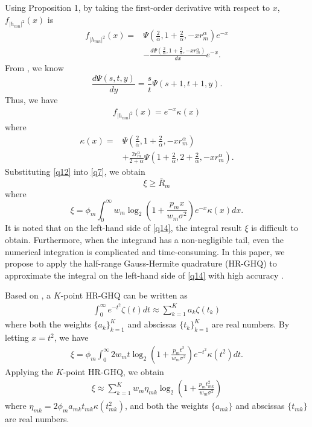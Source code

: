 \documentclass[journal]{IEEEtran}
\begin{document}
Using Proposition 1, by taking the first-order derivative with respect to $x$, $f_{\left|h_{mn} \right|^2} \left(x\right)$ is
\begin{align}
f_{\left|h_{mn} \right|^2} \left(x\right)=&\Psi\left(\frac{2}{\alpha}, 1 + \frac{2}{\alpha}, -xr_m^{\alpha}\right)e^{-x} \nonumber \\&-\frac{d \Psi\left(\frac{2}{\alpha}, 1 + \frac{2}{\alpha}, -x r_m^{\alpha}\right)}{d x} e^{-x}.
\end{align}
From \cite[13.4.8]{MAbramowitz}, we know
\begin{equation}
\frac{d \Psi\left(s, t, y\right)}{dy} = \frac{s}{t}\Psi\left(s+1, t+1, y\right).
\end{equation}
Thus, we have
\begin{align}\label{q12}
f_{\left|h_{mn} \right|^2} \left(x\right)=e^{-x}\kappa\left(x\right)
\end{align}
where
\begin{align}
\kappa\left(x\right) =& \Psi\left(\frac{2}{\alpha}, 1 + \frac{2}{\alpha}, -xr_m^{\alpha}\right)\nonumber \\ & +\frac{2r_m^{\alpha}}{2+\alpha} \Psi\left(1 + \frac{2}{\alpha}, 2+ \frac{2}{\alpha}, -xr_m^{\alpha}\right).
\end{align}
Substituting \eqref{q12} into \eqref{q7}, we obtain
\begin{equation}\label{q14}
\xi\geq \bar{R}_m
\end{equation}
where
\begin{equation}
\xi=\phi_m\int_{0}^{\infty} w_m\log_2\left(1+\frac{p_m x}{w_m \sigma^2}\right) e^{-x}\kappa\left(x\right) dx.
\end{equation}
It is noted that on the left-hand side of \eqref{q14}, the integral result $\xi$ is difficult to obtain. Furthermore, when the integrand has a non-negligible tail, even the numerical integration is complicated and time-consuming. In this paper, we propose to apply the half-range Gauss-Hermite quadrature (HR-GHQ) to approximate the integral on the left-hand side of \eqref{q14} with high accuracy \cite{JSBall,NMSteen}.

Based on \cite{NMSteen}, a $K$-point HR-GHQ can be written as
\begin{align} \label{q16}
\int_{0}^{\infty}e^{-t^2}\zeta\left(t\right)dt\approx\sum\limits_{k = 1}^{K} a_k \zeta\left(t_k\right)
\end{align}
where both the weights $\{a_k\}_{k = 1}^K$ and abscissas $\{t_k\}_{k = 1}^K$ are real numbers. By letting $x=t^2$, we have
\begin{align} \label{q17}
\xi=\phi_m\int_{0}^{\infty}2w_mt\log_2\left(1 + \frac{p_mt^2}{w_m\sigma^2}\right)e^{-t^2}\kappa\left(t^2\right)dt.
\end{align}
Applying the $K$-point HR-GHQ, we obtain
\begin{align}\label{q18}
\xi\approx\sum\limits_{k= 1}^{K} w_m \eta_{mk}\log_2\left(1 + \frac{p_mt_{mk}^2}{w_m\sigma^2}\right)
\end{align}
where $\eta_{mk}=2\phi_m a_{mk}t_{mk}\kappa\left(t_{mk}^2\right)$, and both the weights $\{a_{mk}\}$ and abscissas $\{t_{mk}\}$ are real numbers.
\end{document}

